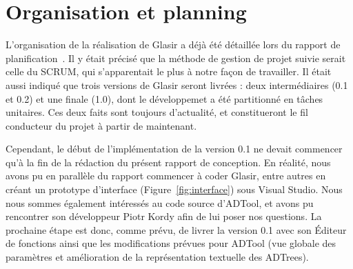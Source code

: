 \section{Organisation et planning}
    \label{sec:orga}

    L'organisation de la réalisation de Glasir a déjà été détaillée lors du rapport de planification~\cite{planif}. Il y était précisé que la méthode de gestion de projet suivie serait celle du SCRUM, qui s'apparentait le plus à notre façon de travailler. Il était aussi indiqué que trois versions de Glasir seront livrées : deux intermédiaires (0.1 et 0.2) et une finale (1.0), dont le développemet a été partitionné en tâches unitaires. Ces deux faits sont toujours d'actualité, et constitueront le fil conducteur du projet à partir de maintenant. 

    Cependant, le début de l'implémentation de la version 0.1 ne devait commencer qu'à la fin de la rédaction du présent rapport de conception. En réalité, nous avons pu en parallèle du rapport commencer à coder Glasir, entre autres en créant un prototype d'interface ({\sc Figure}~\ref{fig:interface}) sous Visual Studio. Nous nous sommes également intéressés au code source d'ADTool, et avons pu rencontrer son développeur Piotr {\sc Kordy} afin de lui poser nos questions. La prochaine étape est donc, comme prévu, de livrer la version 0.1 avec son Éditeur de fonctions ainsi que les modifications prévues pour ADTool (vue globale des paramètres et amélioration de la représentation textuelle des ADTrees).